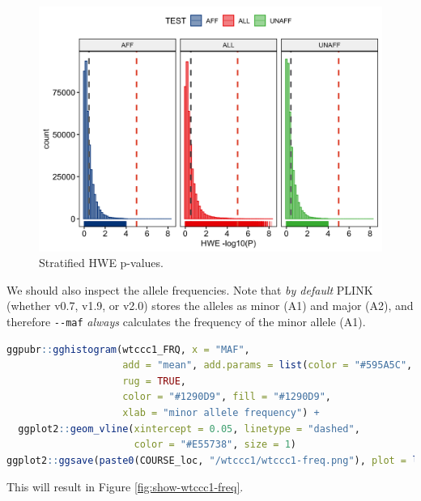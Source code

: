 \documentclass[
]{book}
\newcommand{\passthrough}[1]{#1}
\begin{document}
\begin{figure}

{\centering \includegraphics[width=18.67in]{img/_gwas_wtccc/WTCCC1-HWE} 

}

\caption{Stratified HWE p-values.}\label{fig:show-wtccc1-hwe}
\end{figure}

We should also inspect the allele frequencies. Note that \emph{by default} PLINK (whether v0.7, v1.9, or v2.0) stores the alleles as minor (A1) and major (A2), and therefore \passthrough{\lstinline!--maf!} \emph{always} calculates the frequency of the minor allele (A1).

\begin{lstlisting}[language=R]
ggpubr::gghistogram(wtccc1_FRQ, x = "MAF",
                    add = "mean", add.params = list(color = "#595A5C", linetype = "dashed", size = 1),
                    rug = TRUE,
                    color = "#1290D9", fill = "#1290D9",
                    xlab = "minor allele frequency") +
  ggplot2::geom_vline(xintercept = 0.05, linetype = "dashed",
                      color = "#E55738", size = 1)
ggplot2::ggsave(paste0(COURSE_loc, "/wtccc1/wtccc1-freq.png"), plot = last_plot())
\end{lstlisting}

This will result in Figure \ref{fig:show-wtccc1-freq}.
\end{document}

